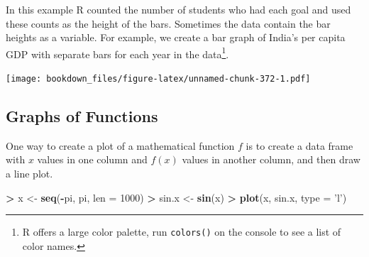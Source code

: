 \documentclass[]{krantz}
\makeatletter
\newenvironment{Shaded}{\begin{snugshade}}{\end{snugshade}}
\newcommand{\KeywordTok}[1]{\textcolor[rgb]{0.27,0.27,0.27}{\textbf{#1}}}
\newcommand{\DataTypeTok}[1]{\textcolor[rgb]{0.27,0.27,0.27}{#1}}
\newcommand{\DecValTok}[1]{\textcolor[rgb]{0.06,0.06,0.06}{#1}}
\newcommand{\StringTok}[1]{\textcolor[rgb]{0.5,0.5,0.5}{#1}}
\newcommand{\OperatorTok}[1]{\textcolor[rgb]{0.43,0.43,0.43}{\textbf{#1}}}
\newcommand{\NormalTok}[1]{#1}
\newenvironment{kframe}{%
\medskip{}
\setlength{\fboxsep}{.8em}
 \def\at@end@of@kframe{}%
 \ifinner\ifhmode%
  \def\at@end@of@kframe{\end{minipage}}%
  \begin{minipage}{\columnwidth}%
 \fi\fi%
 \def\FrameCommand##1{\hskip\@totalleftmargin \hskip-\fboxsep
 \colorbox{shadecolor}{##1}\hskip-\fboxsep
     \hskip-\linewidth \hskip-\@totalleftmargin \hskip\columnwidth}%
 \MakeFramed {\advance\hsize-\width
   \@totalleftmargin\z@ \linewidth\hsize
   \@setminipage}}%
 {\par\unskip\endMakeFramed%
 \at@end@of@kframe}
\renewenvironment{Shaded}{\begin{kframe}}{\end{kframe}}
\makeatother
\begin{document}
In this example R counted the number of students who had each goal and
used these counts as the height of the bars. Sometimes the data contain
the bar heights as a variable. For example, we create a bar graph of
India's per capita GDP with separate bars for each year in the
data\footnote{R offers a large color palette, run \texttt{colors()} on
  the console to see a list of color names.}.

\begin{Shaded}
\end{Shaded}

\texttt{[image: bookdown\_files/figure-latex/unnamed-chunk-372-1.pdf]}

\subsection{Graphs of Functions}\label{graphs-of-functions-1}

One way to create a plot of a mathematical function \(f\) is to create a
data frame with \(x\) values in one column and \(f(x)\) values in
another column, and then draw a line plot.

\begin{Shaded}
\begin{Highlighting}[]
\OperatorTok{>}\StringTok{ }\NormalTok{x <-}\StringTok{ }\KeywordTok{seq}\NormalTok{(}\OperatorTok{-}\NormalTok{pi, pi, }\DataTypeTok{len =} \DecValTok{1000}\NormalTok{)}
\OperatorTok{>}\StringTok{ }\NormalTok{sin.x <-}\StringTok{ }\KeywordTok{sin}\NormalTok{(x)}
\OperatorTok{>}\StringTok{ }\KeywordTok{plot}\NormalTok{(x, sin.x, }\DataTypeTok{type =} \StringTok{'l'}\NormalTok{)}
\end{Highlighting}
\end{Shaded}
\end{document}
